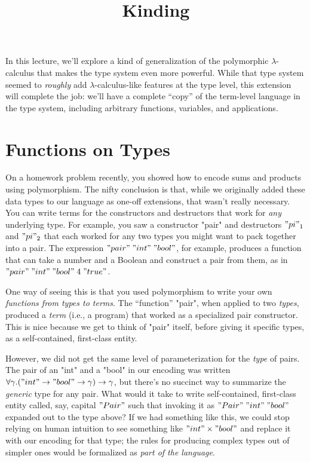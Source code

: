 \title{Kinding}
\maketitle

In this lecture, we'll explore a kind of generalization of the polymorphic
$\lambda$-calculus that makes the type system even more powerful.
While that type system seemed to \emph{roughly} add $\lambda$-calculus-like
features at the type level, this extension will complete the job: we'll have a
complete ``copy'' of the term-level language in the type system, including
arbitrary functions, variables, and applications.

\section{Functions on Types}

On a homework problem recently, you showed how to encode sums and products
using polymorphism.
The nifty conclusion is that, while we originally added these data types to
our language as one-off extensions, that wasn't really necessary.
You can write terms for the constructors and destructors that work for
\emph{any} underlying type.
For example, you saw a constructor "pair" and destructors $"pi"_1$ and
$"pi"_2$ that each worked for any two types you might want to pack together
into a pair.
The expression $"pair" \; "int" \; "bool"$, for example, produces a function
that can take a number and a Boolean and construct a pair from them, as in
$"pair" \; "int" \; "bool" \; 4 \; "true"$.

One way of seeing this is that you used polymorphism to write your own
\emph{functions from types to terms}.
The ``function'' "pair", when applied to two \emph{types}, produced a
\emph{term} (i.e., a program) that worked as a specialized pair constructor.
This is nice because we get to think of "pair" itself, before giving it
specific types, as a self-contained, first-class entity.

However, we did not get the same level of parameterization for the \emph{type}
of pairs.
The pair of an "int" and a "bool" in our encoding was written
$\forall \gamma. ("int" \to "bool" \to \gamma) \to \gamma$, but there's no
succinct way to summarize the \emph{generic} type for any pair.
What would it take to write self-contained, first-class entity called, say,
capital $"Pair"$ such that invoking it as $"Pair" \; "int" \; "bool"$ expanded
out to the type above?
If we had something like this, we could stop relying on human intuition to see
something like $"int" \times "bool"$ and replace it with our encoding for that
type; the rules for producing complex types out of simpler ones would be
formalized as \emph{part of the language}.

